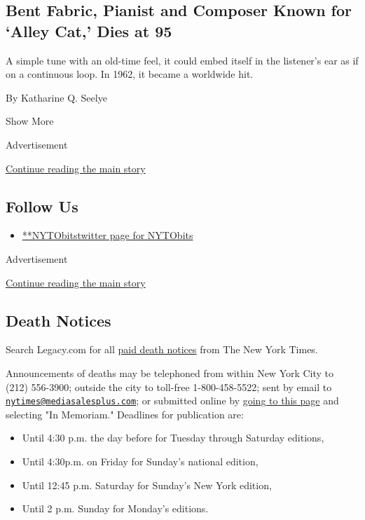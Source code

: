 \begin{enumerate}
  \hypertarget{bent-fabric-pianist-and-composer-known-for-alley-cat-dies-at-95}{%
  \subsection{Bent Fabric, Pianist and Composer Known for `Alley Cat,'
  Dies at
  95}\label{bent-fabric-pianist-and-composer-known-for-alley-cat-dies-at-95}}

  A simple tune with an old-time feel, it could embed itself in the
  listener's ear as if on a continuous loop. In 1962, it became a
  worldwide hit.

  By Katharine Q. Seelye
\end{enumerate}

Show More

Advertisement

\protect\hyperlink{after-mid3}{Continue reading the main story}

\hypertarget{follow-us}{%
\subsection{Follow Us}\label{follow-us}}

\begin{itemize}
\tightlist
\item
  \href{https://twitter.com/NYTObits}{**NYTObitstwitter page for
  NYTObits}
\end{itemize}

Advertisement

\protect\hyperlink{after-mktg}{Continue reading the main story}

\hypertarget{death-notices}{%
\subsection{Death Notices}\label{death-notices}}

Search Legacy.com for all \href{https://www.legacy.com/NYTimes/}{paid
death notices} from The New York Times.

Announcements of deaths may be telephoned from within New York City to
(212) 556-3900; outside the city to toll-free 1-800-458-5522; sent by
email to
\href{mailto:nytimes@mediasalesplus.com}{\nolinkurl{nytimes@mediasalesplus.com}};
or submitted online by
\href{https://advertising.nytimes.com/irj/go/nyt/prtroot/fwk/classified}{going
to this page} and selecting "In Memoriam." Deadlines for publication
are:

\begin{itemize}
\tightlist
\item
  Until 4:30 p.m. the day before for Tuesday through Saturday editions,
\item
  Until 4:30p.m. on Friday for Sunday's national edition,
\item
  Until 12:45 p.m. Saturday for Sunday's New York edition,
\item
  Until 2 p.m. Sunday for Monday's editions.
\end{itemize}

